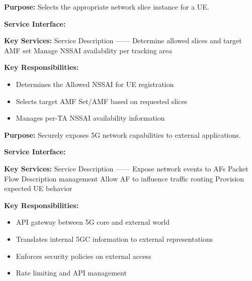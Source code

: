 
\textbf{Purpose:} Selects the appropriate network slice instance for a UE.

\textbf{Service Interface:} 

\textbf{Key Services:}\CNbr{}\textbar{} Service \textbar{} Description \textbar{}\CNbr{}\textbar{}—\textbar{}—\textbar{}\CNbr{}\textbar{}  \textbar{} Determine allowed slices and target AMF set \textbar{}\CNbr{}\textbar{} \allowbreak{} \textbar{} Manage NSSAI availability per tracking area \textbar{}

\textbf{Key Responsibilities:}

\begin{itemize}
\tightlist
\item
  Determines the Allowed NSSAI for UE registration
\item
  Selects target AMF Set/\allowbreak{}AMF based on requested slices
\item
  Manages per-TA NSSAI availability information
\end{itemize}


\textbf{Purpose:} Securely exposes 5G network capabilities to external applications.

\textbf{Service Interface:} 

\textbf{Key Services:}\CNbr{}\textbar{} Service \textbar{} Description \textbar{}\CNbr{}\textbar{}—\textbar{}—\textbar{}\CNbr{}\textbar{}  \textbar{} Expose network events to AFs \textbar{}\CNbr{}\textbar{}  \textbar{} Packet Flow Description management \textbar{}\CNbr{}\textbar{} \allowbreak{} \textbar{} Allow AF to influence traffic routing \textbar{}\CNbr{}\textbar{} \allowbreak{} \textbar{} Provision expected UE behavior \textbar{}

\textbf{Key Responsibilities:}

\begin{itemize}
\tightlist
\item
  API gateway between 5G core and external world
\item
  Translates internal 5GC information to external representations
\item
  Enforces security policies on external access
\item
  Rate limiting and API management
\end{itemize}


